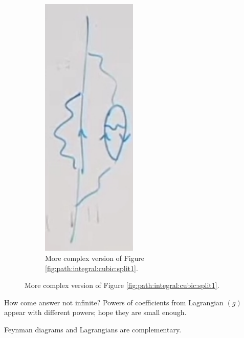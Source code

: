 \documentclass[]{article}
\begin{document}
\begin{figure}[H]
\begin{subfigure}{0.4\textwidth}
		\caption{More complex version of Figure \ref{fig:path:integral:cubic:split1}.}\label{fig:path:integral:cubic:split2}
		\includegraphics[width=0.5\textwidth]{path-integral-cubic-split2}
	\end{subfigure}
\end{figure}

How come answer not infinite? Powers of coefficients from Lagrangian $(g)$ appear with different powers; hope they are small enough.

Feynman diagrams and Lagrangians are complementary.

\printglossaries



\end{document}

